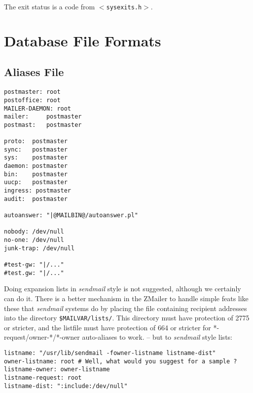 The exit status is a code from {\tt {\(<\)}sysexits.h{\(>\)}}.



\section{Database File Formats}



\subsection{Aliases File}



\begin{verbatim}
postmaster: root
postoffice: root
MAILER-DAEMON: root
mailer:     postmaster
postmast:   postmaster

proto:  postmaster
sync:   postmaster
sys:    postmaster
daemon: postmaster
bin:    postmaster
uucp:   postmaster
ingress: postmaster
audit:  postmaster

autoanswer: "|@MAILBIN@/autoanswer.pl"

nobody: /dev/null
no-one: /dev/null
junk-trap: /dev/null

#test-gw: "|/..."
#test.gw: "|/..."
\end{verbatim}

Doing expansion lists in {\em sendmail\/} style is not suggested, although
we certainly can do it.  There is a better mechanism in the ZMailer
to handle simple feats like these that {\em sendmail\/} systems do by placing
the file containing recipient addresses into the directory  
{\tt \$MAILVAR/lists/}.
This directory must have protection of 2775 or stricter, and the listfile
must have protection of 664 or stricter for *-request/owner-*/*-owner
auto-aliases to work. -- but to {\em sendmail\/} style lists:

\begin{verbatim}
listname: "/usr/lib/sendmail -fowner-listname listname-dist"
owner-listname: root # Well, what would you suggest for a sample ?
listname-owner: owner-listname
listname-request: root
listname-dist: ":include:/dev/null"
\end{verbatim}
